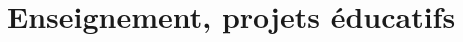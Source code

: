 \documentclass[a4paper,10pt]{article} %
\begin{document}
% 
% 



\section{Enseignement, projets éducatifs}
\end{document}
